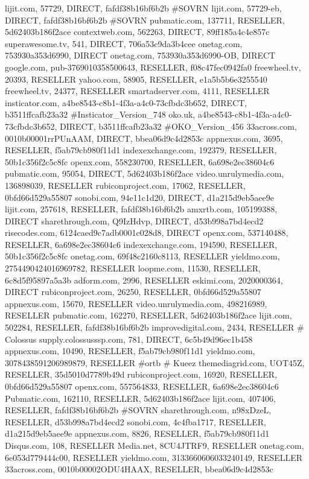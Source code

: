 lijit.com, 57729, DIRECT, fafdf38b16bf6b2b #SOVRN
lijit.com, 57729-eb, DIRECT, fafdf38b16bf6b2b #SOVRN
pubmatic.com, 137711, RESELLER, 5d62403b186f2ace
contextweb.com, 562263, DIRECT, 89ff185a4c4e857c
superawesome.tv, 541, DIRECT, 706a53c9da3b4cee
onetag.com, 753930a353d6990, DIRECT
onetag.com, 753930a353d6990-OB, DIRECT
google.com, pub-3769010358500643, RESELLER, f08c47fec0942fa0
freewheel.tv, 20393, RESELLER
yahoo.com, 58905, RESELLER, e1a5b5b6e3255540
freewheel.tv, 24377, RESELLER
smartadserver.com, 4111, RESELLER
insticator.com, a4be8543-c8b1-4f3a-a4c0-73cfbdc3b652, DIRECT, b3511ffcafb23a32 #Insticator_Version_748
oko.uk, a4be8543-c8b1-4f3a-a4c0-73cfbdc3b652, DIRECT, b3511ffcafb23a32 #OKO_Version_456
33across.com, 0010b00001rrPUnAAM, DIRECT, bbea06d9c4d2853c
appnexus.com, 3695, RESELLER, f5ab79cb980f11d1
indexexchange.com, 192379, RESELLER, 50b1c356f2c5c8fc
openx.com, 558230700, RESELLER, 6a698e2ec38604c6
pubmatic.com, 95054, DIRECT, 5d62403b186f2ace
video.unrulymedia.com, 136898039, RESELLER
rubiconproject.com, 17062, RESELLER, 0bfd66d529a55807
sonobi.com, 94e11c1d20, DIRECT, d1a215d9eb5aee9e
lijit.com, 257618, RESELLER, fafdf38b16bf6b2b
amxrtb.com, 105199388, DIRECT
sharethrough.com, Q9IzHdvp, DIRECT, d53b998a7bd4ecd2
risecodes.com, 6124caed9c7adb0001c028d8, DIRECT
openx.com, 537140488, RESELLER, 6a698e2ec38604c6
indexexchange.com, 194590, RESELLER, 50b1c356f2c5c8fc
onetag.com, 69f48c2160c8113, RESELLER
yieldmo.com, 2754490424016969782, RESELLER
loopme.com, 11530, RESELLER, 6c8d5f95897a5a3b
adform.com, 2996, RESELLER
eskimi.com, 2020000364, DIRECT
rubiconproject.com, 26250, RESELLER, 0bfd66d529a55807
appnexus.com, 15670, RESELLER
video.unrulymedia.com, 498216989, RESELLER
pubmatic.com, 162270, RESELLER, 5d62403b186f2ace
lijit.com, 502284, RESELLER, fafdf38b16bf6b2b
improvedigital.com, 2434, RESELLER
# Colossus
supply.colossusssp.com, 781, DIRECT, 6c5b49d96ec1b458
appnexus.com, 10490, RESELLER, f5ab79cb980f11d1
yieldmo.com, 3078438591206989879, RESELLER #ortb
# Kueez
themediagrid.com, UOT45Z, RESELLER, 35d5010d7789b49d
rubiconproject.com, 16920, RESELLER, 0bfd66d529a55807
openx.com, 557564833, RESELLER, 6a698e2ec38604c6
Pubmatic.com, 162110, RESELLER, 5d62403b186f2ace
lijit.com, 407406, RESELLER, fafdf38b16bf6b2b #SOVRN
sharethrough.com, n98xDzeL, RESELLER, d53b998a7bd4ecd2
sonobi.com, 4c4fba1717, RESELLER, d1a215d9eb5aee9e
appnexus.com, 8826, RESELLER, f5ab79cb980f11d1
Disqus.com, 108, RESELLER
Media.net, 8CU4JTRF9, RESELLER
onetag.com, 6e053d779444c00, RESELLER
yieldmo.com, 3133660606033240149, RESELLER
33across.com, 0010b00002ODU4HAAX, RESELLER, bbea06d9c4d2853c
